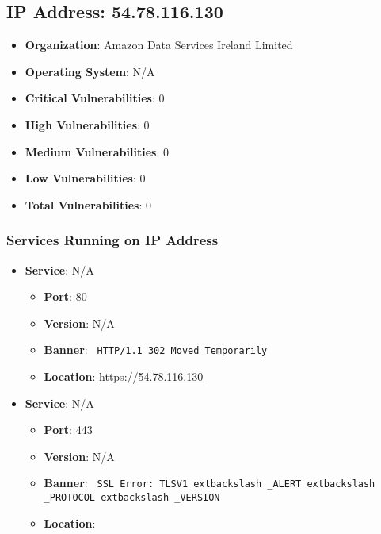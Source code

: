 \documentclass{article}
\begin{document}
\clearpage



\subsection*{IP Address: 54.78.116.130}

\begin{itemize}
    \item \textbf{Organization}: Amazon Data Services Ireland Limited
    \item \textbf{Operating System}:  N/A 
    \item \textbf{Critical Vulnerabilities}: 0
    \item \textbf{High Vulnerabilities}: 0
    \item \textbf{Medium Vulnerabilities}: 0
    \item \textbf{Low Vulnerabilities}: 0
    \item \textbf{Total Vulnerabilities}: 0
\end{itemize}

\subsubsection*{Services Running on IP Address}

\begin{itemize}
    
        \item \textbf{Service}: N/A
        \begin{itemize}
            \item \textbf{Port}: 80
            \item \textbf{Version}:  N/A 
            \item \textbf{Banner}: \texttt{ HTTP/1.1 302 Moved Temporarily
 }
            \item \textbf{Location}: \href{ https://54.78.116.130 }{ https://54.78.116.130 }
        \end{itemize}
    
        \item \textbf{Service}: N/A
        \begin{itemize}
            \item \textbf{Port}: 443
            \item \textbf{Version}:  N/A 
            \item \textbf{Banner}: \texttt{ SSL Error: TLSV1	extbackslash _ALERT	extbackslash _PROTOCOL	extbackslash _VERSION }
            \item \textbf{Location}: \href{  }{  }
        \end{itemize}
    
\end{itemize}
\end{document}
